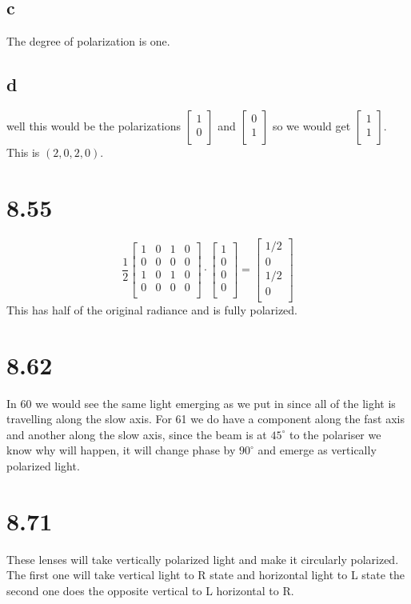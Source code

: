 \documentclass[12pt,a4paper]{article}
\begin{document}
\subsection{c}
The degree of polarization is one.
\subsection{d}
well this would be the polarizations $\begin{bmatrix} 1 \\ 0 \\ \end{bmatrix}$ and $\begin{bmatrix} 0 \\ 1 \\ \end{bmatrix}$ so we would get $\begin{bmatrix} 1 \\ 1 \\ \end{bmatrix}$. This is $(2,0,2,0)$.
\section{8.55}
$$\frac{1}{2} \begin{bmatrix} 1 & 0 & 1 & 0 \\ 0 & 0 & 0 & 0 \\ 1 & 0 & 1 & 0 \\ 0 & 0 & 0 & 0 \\ \end{bmatrix} \cdot \begin{bmatrix} 1 \\ 0 \\ 0 \\ 0 \\ \end{bmatrix}=\begin{bmatrix} 1/2 \\ 0 \\ 1/2 \\ 0 \\ \end{bmatrix}$$
This has half of the original radiance and is fully polarized.
\section{8.62}
In 60 we would see the same light emerging as we put in since all of the light is travelling along the slow axis.  For 61 we do have a component along the fast axis and another along the slow axis, since the beam is at $45^\circ$ to the polariser we know why will happen, it will change phase by $90^\circ$ and emerge as vertically polarized light.
\section{8.71}
These lenses will take vertically polarized light and make it circularly polarized.  The first one will take vertical light to R state and horizontal light to L state the second one does the opposite vertical to L horizontal to R.
\end{document}
